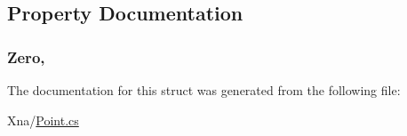 \subsection{Property Documentation}
\hypertarget{structMicrosoft_1_1Xna_1_1Framework_1_1Point_acf3ab0e7211a315c5ca6c2da31096ef1}{}
\subsubsection[{Zero}]{ Zero\hspace{0.3cm}{\ttfamily [static]}, {\ttfamily [get]}}\label{structMicrosoft_1_1Xna_1_1Framework_1_1Point_acf3ab0e7211a315c5ca6c2da31096ef1}


The documentation for this struct was generated from the following file\+:\begin{DoxyCompactItemize}
\item 
Xna/\hyperlink{Point_8cs}{Point.\+cs}\end{DoxyCompactItemize}
